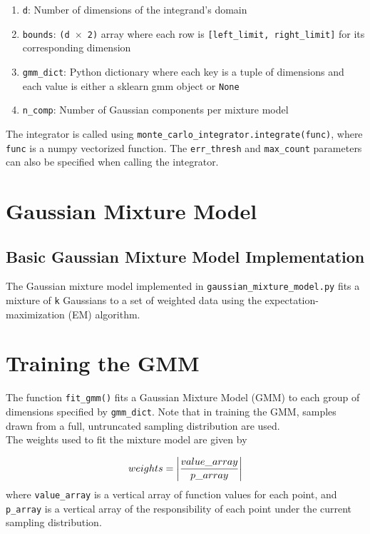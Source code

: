 \documentclass{article}
\begin{document}
\begin{enumerate}

\item \texttt{d}: Number of dimensions of the integrand's domain

\item \texttt{bounds}: \texttt{(d $\times$ 2)} array where each row is
\texttt{[left\_limit, right\_limit]} for its corresponding dimension

\item \texttt{gmm\_dict}: Python dictionary where each key is a tuple of
dimensions and each value is either a sklearn gmm object or \texttt{None}

\item \texttt{n\_comp}: Number of Gaussian components per mixture model

\end{enumerate}
The integrator is called using \texttt{monte\_carlo\_integrator.integrate(func)},
where \texttt{func} is a numpy vectorized function. The \texttt{err\_thresh} and
\texttt{max\_count} parameters can also be specified when calling the integrator.

\section{Gaussian Mixture Model}

\subsection{Basic Gaussian Mixture Model Implementation}

The Gaussian mixture model implemented in \texttt{gaussian\_mixture\_model.py}
fits a mixture of \texttt{k} Gaussians to a set of weighted data using the
expectation-maximization (EM) algorithm.  

\section{Training the GMM}

The function \texttt{fit\_gmm()}
fits a Gaussian Mixture Model (GMM) to each group of dimensions specified by
\texttt{gmm\_dict}. Note that in training the GMM, samples drawn from a full,
untruncated sampling distribution are used.\\

The weights used to fit the mixture model are given by

\begin{equation}
    weights = \left|value\_array \over p\_array\right|
\end{equation}
where \texttt{value\_array} is a vertical array of function values for each
point, and \texttt{p\_array} is a vertical array of the responsibility of each
point under the current sampling distribution. \\
\end{document}
